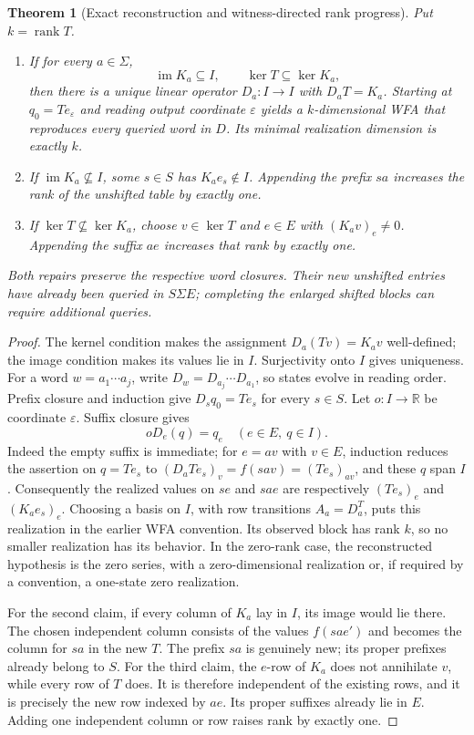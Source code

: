 \documentclass[11pt]{article}
\newtheorem{theorem}{Theorem}[section]
\theoremstyle{definition}
\theoremstyle{remark}
\begin{document}
\begin{theorem}[Exact reconstruction and witness-directed rank progress]
\label{ce:repair}
Put $k=\operatorname{rank}T$.
\begin{enumerate}
\item If for every $a\in\Sigma$,
\[
 \operatorname{im}K_a\subseteq I,
 \qquad \ker T\subseteq\ker K_a,
\]
then there is a unique linear operator $D_a:I\to I$ with $D_aT=K_a$.
Starting at $q_0=Te_\varepsilon$ and reading output coordinate
$\varepsilon$ yields a $k$-dimensional WFA that reproduces every queried
word in $D$. Its minimal realization dimension is exactly $k$.
\item If $\operatorname{im}K_a\not\subseteq I$, some $s\in S$ has
$K_ae_s\notin I$. Appending the prefix $sa$ increases the rank of the
unshifted table by exactly one.
\item If $\ker T\not\subseteq\ker K_a$, choose $v\in\ker T$ and
$e\in E$ with $(K_av)_e\ne0$. Appending the suffix $ae$ increases
that rank by exactly one.
\end{enumerate}
Both repairs preserve the respective word closures. Their new unshifted
entries have already been queried in $S\Sigma E$; completing the enlarged
shifted blocks can require additional queries.
\end{theorem}
\begin{proof}
The kernel condition makes the assignment $D_a(Tv)=K_av$ well-defined;
the image condition makes its values lie in $I$. Surjectivity onto $I$
gives uniqueness. For a word $w=a_1\cdots a_j$, write
$D_w=D_{a_j}\cdots D_{a_1}$, so states evolve in reading order.
Prefix closure and induction give $D_sq_0=Te_s$ for every $s\in S$.
Let $o:I\to\mathbb R$ be coordinate $\varepsilon$. Suffix closure gives
\[
 oD_e(q)=q_e\quad(e\in E,\ q\in I).
\]
Indeed the empty suffix is immediate; for $e=av$ with $v\in E$, induction
reduces the assertion on $q=Te_s$ to
$(D_aTe_s)_v=f(sav)=(Te_s)_{av}$, and these $q$ span $I$.
Consequently the realized values on $se$ and $sae$ are respectively
$(Te_s)_e$ and $(K_ae_s)_e$. Choosing a basis on $I$, with row transitions
$A_a=D_a^T$, puts this realization in the earlier WFA convention. Its
observed block has rank $k$, so no smaller realization has its behavior.
In the zero-rank case, the reconstructed hypothesis is the zero series,
with a zero-dimensional realization
or, if required by a convention, a one-state zero realization.

For the second claim, if every column of $K_a$ lay in $I$, its image
would lie there. The chosen independent column consists of the values
$f(sae')$ and becomes the column for $sa$ in the new $T$. The prefix
$sa$ is genuinely new; its proper prefixes already belong to $S$.
For the third claim, the $e$-row of $K_a$ does not annihilate $v$, while
every row of $T$ does. It is therefore independent of the existing rows,
and it is precisely the new row indexed by $ae$. Its proper suffixes
already lie in $E$. Adding one independent column or row raises rank by
exactly one.
\end{proof}
\end{document}
